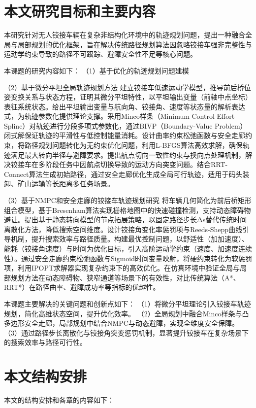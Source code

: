 \documentclass[master,academic]{ysuthesis} %
\begin{document}
	\section{本文研究目标和主要内容}
	本研究针对无人铰接车辆在复杂非结构化环境中的轨迹规划问题，提出一种融合全局与局部规划的优化框架，旨在解决传统路径规划算法因忽略铰接车强非完整性与运动学约束导致的路径不可跟踪、避障安全性不足等核心问题。

	本课题的研究内容如下：
	（1）基于优化的轨迹规划问题建模

	（2）基于微分平坦全局轨迹规划方法
	建立铰接车低速运动学模型，推导前后桥位姿变换关系与状态方程，证明其微分平坦特性，以平坦输出变量（前轴中点坐标）表征系统状态。给出平坦输出变量与航向角、铰接角、速度等状态量的解析表达式，为轨迹参数化提供理论支撑。采用Minco样条（Minimum Control Effort Spline）对轨迹进行分段多项式参数化，通过BIVP（Boundary-Value Problem）闭式解保证轨迹的平滑性与低控制能量消耗。设计曲率约束松弛函数与安全走廊约束，将路径规划问题转化为无约束优化问题，利用L-BFGS算法高效求解，确保轨迹满足最大转向半径与避障要求。提出航点切向一致性约束与换向点处理机制，解决铰接车在多阶段任务中因航点切换导致的运动方向突变问题。结合RRT-Connect算法生成初始路径，通过安全走廊优化生成全局可行轨迹，适用于码头装卸、矿山运输等长距离多任务场景。

	（3）基于NMPC和安全走廊的铰接车轨迹规划研究
	将车辆几何简化为前后桥矩形组合模型，基于Bresenham算法实现栅格地图中的快速碰撞检测，支持动态障碍物避让。提出基于静态转向模型的节点拓展策略，以固定路径步长Δs替代传统时间离散化方法，降低搜索空间维度。设计铰接角变化率惩罚项与Reeds-Shepp曲线引导机制，提升搜索效率与路径质量。构建最优控制问题，以舒适性（加加速度）、能耗（铰接角速度）与时间为优化目标，引入高阶运动学约束（速度、加速度连续性）。通过安全走廊约束松弛函数与Sigmoid时间变量映射，将硬约束转化为软惩罚项，利用IPOPT求解器实现复杂约束下的高效优化。在仿真环境中验证全局与局部规划方法在动态障碍物、狭窄通道等场景下的有效性，对比传统算法（A*、RRT*）在路径曲率、避障成功率等指标的优越性。

	本课题主要解决的关键问题和创新点如下：  
	（1）将微分平坦理论引入铰接车轨迹规划，简化高维状态空间，提升优化效率。
	（2）全局规划中融合Minco样条与凸多边形安全走廊，局部规划中结合NMPC与动态避障，实现全维度安全保障。
	（3）通过路径步长离散化与铰接角突变惩罚机制，显著提升铰接车在复杂场景下的搜索效率与路径可行性。

	\section{本文结构安排}
	本文的结构安排和各章的内容如下：
\end{document}
